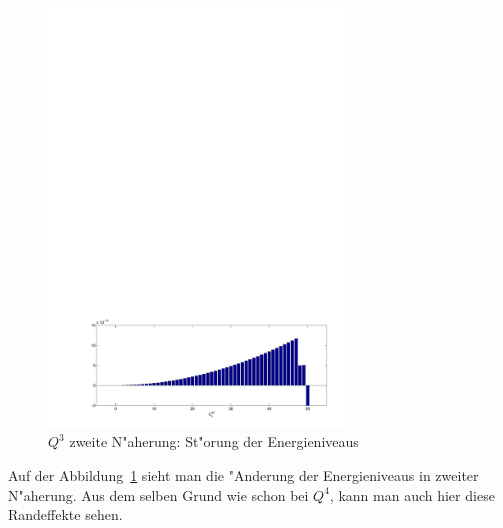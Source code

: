 \begin{refsection}
\begin{figure}	%
\centering
\includegraphics[width=0.7\textwidth]{anharmonisch/images/x3/EK2.pdf}
\caption{$Q^3$ zweite N"aherung: St"orung der Energieniveaus  
\label{skript:x3_EK2}}
\end{figure}

Auf der Abbildung~\ref{skript:x3_EK2} sieht man die "Anderung der Energieniveaus
in zweiter N"aherung.
Aus dem selben Grund wie schon bei $Q^4$, kann man auch hier diese Randeffekte
sehen.


\end{refsection}
